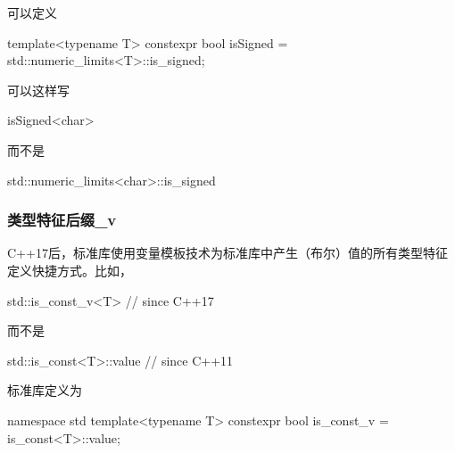 可以定义

\begin{cpp}
template<typename T>
constexpr bool isSigned = std::numeric_limits<T>::is_signed;
\end{cpp}

可以这样写

\begin{cpp}
isSigned<char>
\end{cpp}

而不是

\begin{cpp}
std::numeric_limits<char>::is_signed
\end{cpp}

\subsubsection{类型特征后缀\_v}

C++17后，标准库使用变量模板技术为标准库中产生（布尔）值的所有类型特征定义快捷方式。比如，

\begin{cpp}
std::is_const_v<T> // since C++17
\end{cpp}

而不是

\begin{cpp}
std::is_const<T>::value // since C++11
\end{cpp}

标准库定义为

\begin{cpp}
namespace std {
	template<typename T> constexpr bool is_const_v = is_const<T>::value;
}
\end{cpp}























